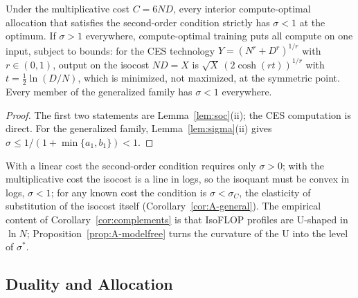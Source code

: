 \begin{corollary}\label{cor:complements}
Under the multiplicative cost $C=6ND$, every interior compute-optimal allocation that satisfies the second-order
condition strictly has $\sigma<1$ at the optimum. If $\sigma>1$ everywhere, compute-optimal training puts all compute on
one input, subject to bounds: for the CES technology $Y=(N^r+D^r)^{1/r}$ with $r\in(0,1)$, output on the isocost $ND=X$ is
$\sqrt X\,(2\cosh(rt))^{1/r}$ with $t=\tfrac12\ln(D/N)$, which is minimized, not maximized, at the symmetric point. Every
member of the generalized family has $\sigma<1$ everywhere.
\end{corollary}

\begin{proof}
The first two statements are Lemma~\ref{lem:soc}(ii); the CES computation is direct. For the generalized family,
Lemma~\ref{lem:sigma}(ii) gives $\sigma\le1/(1+\min\{a_1,b_1\})<1$.
\end{proof}

\begin{remark}
With a linear cost the second-order condition requires only $\sigma>0$; with the multiplicative cost the isocost is a line
in logs, so the isoquant must be convex in logs, $\sigma<1$; for any known cost the condition is $\sigma<\sigma_C$, the
elasticity of substitution of the isocost itself (Corollary~\ref{cor:A-general}). The empirical content of Corollary~\ref{cor:complements} is
that IsoFLOP profiles are U-shaped in $\ln N$; Proposition~\ref{prop:A-modelfree} turns the curvature of the U into the
level of $\sigma^*$.
\end{remark}

\subsection{Duality and Allocation}\label{app:duality}

